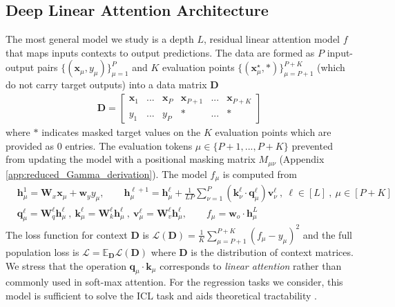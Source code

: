 \documentclass{article} %
\def\x{\bm x}
\def\w{\bm w}
\def\h{\bm h}
\def\v{\bm v}
\begin{document}
\subsection{Deep Linear Attention Architecture}
\vspace{-5pt}
The most general model we study is a depth $L$, residual linear attention model $f$ that maps inputs contexts to output predictions. The data are formed as $P$ input-output pairs $\{ (\bm x_\mu, y_\mu) \}_{\mu=1}^P$ and $K$ evaluation points $\{ (\bm x^\star_\mu, *) \}_{\mu=P+1}^{P+K}$ (which do not carry target outputs) into a data matrix $\bm D$
\begin{align}
    \bm D = \begin{bmatrix}
        \x_1 & ... & \x_P & \x_{P+1} & ... & \x_{P+K}
        \\
        y_1 & ... & y_P &  * & ... & *
    \end{bmatrix}
\end{align}
where $*$ indicates masked target values on the $K$ evaluation points which are provided as $0$ entries. The evaluation tokens $\mu \in \{ P+1,... ,P+K\}$ prevented from updating the model with a positional masking matrix $M_{\mu\nu}$ (Appendix \ref{app:reduced_Gamma_derivation}). The model $f_\mu$ is computed from
\begin{align}
    &\h^1_\mu = \bm W_x \x_\mu + \w_y y_\mu, \quad  \quad  \h^{\ell+1}_{\mu} = \h^{\ell}_\mu + \frac{1}{L P} \sum_{\nu=1}^P \left( \bm k^\ell_\nu \cdot \bm q^\ell_\mu \right) \v^\ell_\nu  \ , \ \ell \in [L] \ , \  \mu \in [P+K] \nonumber
    \\
    &\bm q^\ell_\mu = \bm W_q^\ell \h^{\ell}_\mu \ , \ \bm k^\ell_\mu = \bm W_k^\ell \h^{\ell}_\mu \ , \ \bm v^\ell_\mu = \bm W_v^\ell \h^\ell_\mu,  \quad \quad f_\mu = \bm w_{o} \cdot \h^L_\mu
\end{align}
The loss function for context $\bm D$ is $\mathcal L({\bm D}) = \frac{1}{K} \sum_{\mu=P+1}^{P+K} ( f_{\mu} - y_\mu  )^2$ and the full population loss is $\mathcal L = \mathbb{E}_{\bm D} \mathcal L(\bm D)$ where $\bm D$ is the distribution of context matrices. We stress that the operation $\bm q_\mu \cdot \bm k_\mu$ corresponds to \textit{linear attention} rather than commonly used in soft-max attention. For the regression tasks we consider, this model is sufficient to solve the ICL task \citep{ahn2023transformerslearnimplementpreconditioned,von2023transformers} and aids theoretical tractability \citep{lu2025asymptotictheoryincontextlearning, zhang2025trainingdynamicsincontextlearning}. 
\end{document}
